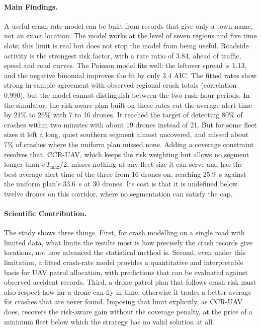 \documentclass[11pt]{article}
\begin{document}
\paragraph{Main Findings.}
A useful crash-rate model can be built from records that give only a town name,
not an exact location. The model works at the level of seven regions and five
time slots; this limit is real but does not stop the model from being useful.
Roadside activity is the strongest risk factor, with a rate ratio of 3.84,
ahead of traffic, speed and road curves. The Poisson model fits well: the
leftover spread is 1.13, and the negative binomial improves the fit by only
3.4 AIC. The fitted rates show strong in-sample agreement with observed regional crash totals (correlation 0.990), but the model cannot distinguish between the two
rush-hour periods. In the simulator, the risk-aware plan built on these rates cut the average alert time by 21\% to 26\% with 7 to 16 drones. It reached the target of detecting 80\% of crashes within two minutes with about 19 drones instead of 21. But for some fleet sizes it left a long, quiet southern segment almost uncovered, and missed about 7\% of crashes where the uniform plan missed none.
Adding a coverage constraint resolves that. CCR-UAV, which keeps the risk
weighting but allows no segment longer than $v\,T_{\max}/2$, misses nothing at
any fleet size it can serve and has the best average alert time of the three
from 16 drones on, reaching 25.9~s against the uniform plan's 33.6~s at 30
drones. Its cost is that it is undefined below twelve drones on this corridor,
where no segmentation can satisfy the cap.

\paragraph{Scientific Contribution.}
The study shows three things. First, for crash modelling on a single road with
limited data, what limits the results most is how precisely the crash records
give locations, not how advanced the statistical method is. Second, even under this limitation, a fitted crash-rate model provides a quantitative and interpretable basis
for UAV patrol allocation, with predictions that can be evaluated against observed accident records. Third, a drone patrol plan that follows crash risk must also respect how far a drone can fly in time; otherwise it trades a better average for crashes that are never found. Imposing that limit explicitly, as
CCR-UAV does, recovers the risk-aware gain without the coverage penalty, at
the price of a minimum fleet below which the strategy has no valid solution
at all.
\end{document}
